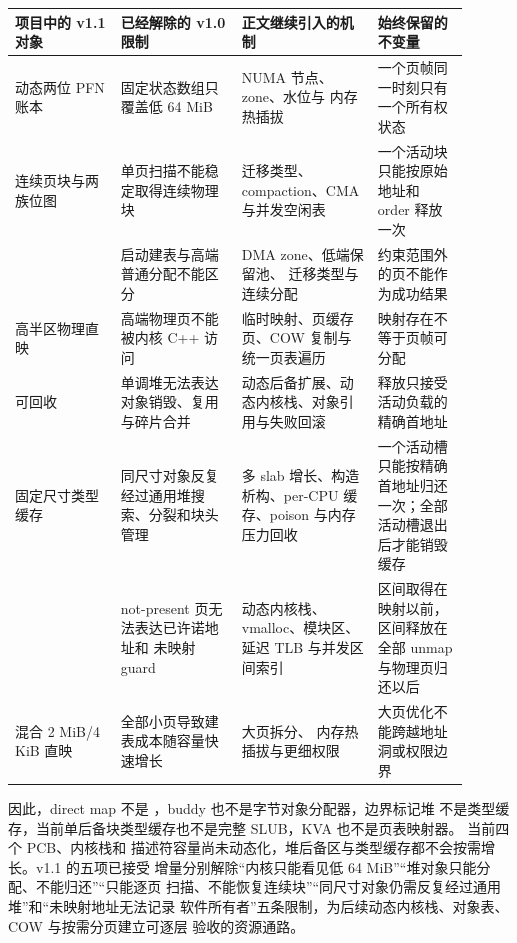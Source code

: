 \begin{longtable}{|L{0.21\linewidth}|L{0.24\linewidth}|L{0.27\linewidth}|L{0.18\linewidth}|}
\toprule
项目中的 v1.1 对象 & 已经解除的 v1.0 限制 & 正文继续引入的机制 & 始终保留的不变量 \\
\midrule
\endhead
动态两位 PFN 账本 & 固定状态数组只覆盖低 64 MiB & NUMA 节点、zone、水位与
内存热插拔 & 一个页帧同一时刻只有一个所有权状态 \\\tablerowrule
连续页块与两族位图 & 单页扫描不能稳定取得连续物理块 &
迁移类型、compaction、CMA 与并发空闲表 &
一个活动块只能按原始地址和 order 释放一次 \\\tablerowrule
{} & 启动建表与高端普通分配不能区分 & DMA zone、低端保留池、
迁移类型与连续分配 & 约束范围外的页不能作为成功结果 \\\tablerowrule
高半区物理直映 & 高端物理页不能被内核 C++ 访问 & 临时映射、页缓存页、COW
复制与统一页表遍历 & 映射存在不等于页帧可分配 \\\tablerowrule
可回收  & 单调堆无法表达对象销毁、复用与碎片合并 &
动态后备扩展、动态内核栈、对象引用与失败回滚 &
释放只接受活动负载的精确首地址 \\\tablerowrule
固定尺寸类型缓存 & 同尺寸对象反复经过通用堆搜索、分裂和块头管理 &
多 slab 增长、构造析构、per-CPU 缓存、poison 与内存压力回收 &
一个活动槽只能按精确首地址归还一次；全部活动槽退出后才能销毁缓存
\\\tablerowrule
{} & not-present 页无法表达已许诺地址和
未映射 guard & 动态内核栈、vmalloc、模块区、延迟 TLB 与并发区间索引 &
区间取得在映射以前，区间释放在全部 unmap 与物理页归还以后
\\\tablerowrule
混合 2 MiB/4 KiB 直映 & 全部小页导致建表成本随容量快速增长 & 大页拆分、
内存热插拔与更细权限 & 大页优化不能跨越地址洞或权限边界 \\
\bottomrule
\end{longtable}

因此，direct map 不是 ，buddy 也不是字节对象分配器，边界标记堆
不是类型缓存，当前单后备块类型缓存也不是完整 SLUB，KVA 也不是页表映射器。
当前四个 PCB、内核栈和
描述符容量尚未动态化，堆后备区与类型缓存都不会按需增长。v1.1 的五项已接受
增量分别解除“内核只能看见低 64 MiB”“堆对象只能分配、不能归还”“只能逐页
扫描、不能恢复连续块”“同尺寸对象仍需反复经过通用堆”和“未映射地址无法记录
软件所有者”五条限制，为后续动态内核栈、对象表、COW 与按需分页建立可逐层
验收的资源通路。
